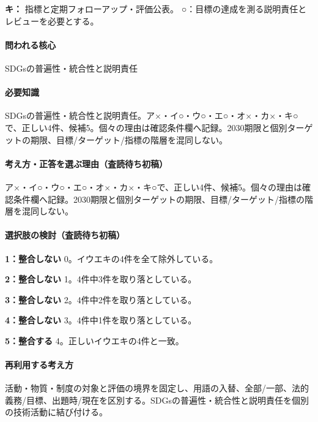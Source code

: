 \noindent\textbf{キ：} 指標と定期フォローアップ・評価公表。 ○：目標の達成を測る説明責任とレビューを必要とする。\par

\paragraph{問われる核心} SDGsの普遍性・統合性と説明責任

\paragraph{必要知識} SDGsの普遍性・統合性と説明責任。ア×・イ○・ウ○・エ○・オ×・カ×・キ○で、正しい4件、候補5。個々の理由は確認条件欄へ記録。2030期限と個別ターゲットの期限、目標/ターゲット/指標の階層を混同しない。

\paragraph{考え方・正答を選ぶ理由（査読待ち初稿）} ア×・イ○・ウ○・エ○・オ×・カ×・キ○で、正しい4件、候補5。個々の理由は確認条件欄へ記録。2030期限と個別ターゲットの期限、目標/ターゲット/指標の階層を混同しない。

\paragraph{選択肢の検討（査読待ち初稿）}\mbox{}\par

\noindent\textbf{1：整合しない} 0。イウエキの4件を全て除外している。\par

\noindent\textbf{2：整合しない} 1。4件中3件を取り落としている。\par

\noindent\textbf{3：整合しない} 2。4件中2件を取り落としている。\par

\noindent\textbf{4：整合しない} 3。4件中1件を取り落としている。\par

\noindent\textbf{5：整合する} 4。正しいイウエキの4件と一致。\par

\paragraph{再利用する考え方} 活動・物質・制度の対象と評価の境界を固定し、用語の入替、全部/一部、法的義務/目標、出題時/現在を区別する。SDGsの普遍性・統合性と説明責任を個別の技術活動に結び付ける。

